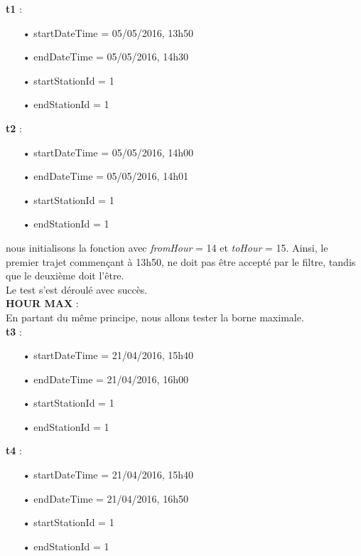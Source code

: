 \documentclass[12pt]{article}
\begin{document}
	\textbf{t1} :
	\begin{itemize}
	\item[•] startDateTime = 05/05/2016, 13h50
	\item[•] endDateTime = 05/05/2016, 14h30
	\item[•] startStationId = 1
	\item[•] endStationId = 1\\
	\end{itemize}

	\textbf{t2} :
	\begin{itemize}
	\item[•] startDateTime = 05/05/2016, 14h00
	\item[•] endDateTime = 05/05/2016, 14h01
	\item[•] startStationId = 1
	\item[•] endStationId = 1 \\
	\end{itemize}
	
	nous initialisons la fonction avec \textit{fromHour} = 14 et \textit{toHour} = 15. Ainsi, le premier trajet commençant à 13h50, ne doit pas être accepté par le filtre, tandis que le deuxième doit l’être.\\

	Le test s’est déroulé avec succès.\\
	
	\textbf{HOUR MAX} :\\
	En partant du même principe, nous allons tester la borne maximale.\\

	\textbf{t3} :
	\begin{itemize}
	\item[•] startDateTime = 21/04/2016, 15h40
	\item[•] endDateTime = 21/04/2016, 16h00
	\item[•] startStationId = 1
	\item[•] endStationId = 1 \\
	\end{itemize}
	
	
	\textbf{t4} :	
	\begin{itemize}
	\item[•] startDateTime = 21/04/2016, 15h40
	\item[•] endDateTime = 21/04/2016, 16h50
	\item[•] startStationId = 1
	\item[•] endStationId = 1 \\
	\end{itemize}
	
\end{document}
